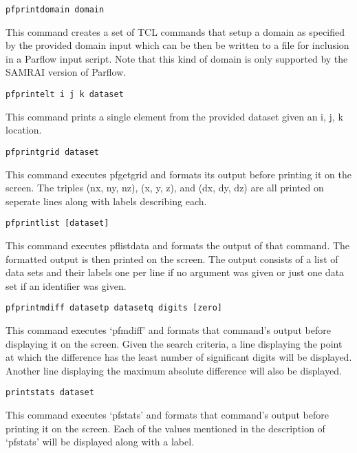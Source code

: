 \begin{description}
\item{\begin{verbatim}pfprintdomain domain\end{verbatim}} This command
 creates a set of TCL commands that setup a domain as specified by the
 provided domain input which can be then be written to a file for
 inclusion in a Parflow input script.  Note that this kind of domain
 is only supported by the SAMRAI version of Parflow.

\item{\begin{verbatim}pfprintelt i j k dataset\end{verbatim}}
This command prints a single element from the provided dataset given an i, j, k location.

\item{\begin{verbatim}pfprintgrid dataset\end{verbatim}}
This command executes pfgetgrid and formats its output before printing
it on the screen.  The triples (nx, ny, nz), (x, y, z), and
(dx, dy, dz) are all printed on seperate lines along with labels
describing each.


\item{\begin{verbatim}pfprintlist [dataset]\end{verbatim}}
This command executes pflistdata and formats the output of that
command.  The formatted output is then printed on the screen.  The
output consists of a list of data sets and their labels one per line
if no argument was given or just one data set if an identifier was
given.


\item{\begin{verbatim}pfprintmdiff datasetp datasetq digits [zero]\end{verbatim}}
This command executes `pfmdiff' and formats that command's output
before displaying it on the screen.  Given the search criteria, a line
displaying the point at which the difference has the least number of
significant digits will be displayed.  Another line displaying the
maximum absolute difference will also be displayed.


\item{\begin{verbatim}printstats dataset\end{verbatim}}
This command executes `pfstats' and formats that command's output
before printing it on the screen.  Each of the values mentioned in the
description of `pfstats' will be displayed along with a label.



\end{description}
